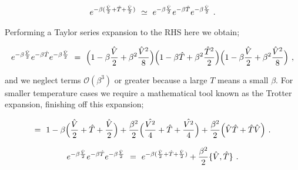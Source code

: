 \documentclass{article}
\begin{document}
\begin{equation} \label{eb-eq-1-185}
e^{-\beta ( \frac{\hat{V}}{2} + \hat{T} + \frac{\hat{V}}{2} )} \hspace{0.125cm} \simeq \hspace{0.125cm} e^{-\beta \frac{\hat{V}}{2}} e^{-\beta \hat{T}} e^{-\beta \frac{\hat{V}}{2}} \hspace{0.125cm} .
\end{equation}

Performing a Taylor series expansion to the RHS here we obtain;

\begin{equation} \label{eb-eq-1-186}
e^{-\beta \frac{\hat{V}}{2}} e^{-\beta \hat{T}} e^{-\beta \frac{\hat{V}}{2}} \hspace{0.125cm} = \hspace{0.125cm} \Big( 1 - \beta \frac{\hat{V}}{2} + \beta^2 \frac{\hat{V}^2}{8} \Big) \Big( 1 - \beta \hat{T} + \beta^2 \frac{\hat{T}^2}{2} \Big) \Big( 1 - \beta \frac{\hat{V}}{2} + \beta^2 \frac{\hat{V}^2}{8} \Big) \hspace{0.125cm} ,
\end{equation}

and we neglect terms \begin{math} \mathcal{O}(\beta^3) \end{math} or greater because a large \begin{math} T \end{math} means a small \begin{math} \beta \end{math}. For smaller temperature cases we require a mathematical tool known as the Trotter expansion, finishing off this expansion;

\begin{equation} \label{eb-eq-1-187}
= \hspace{0.125cm} 1 - \beta \Big( \frac{\hat{V}}{2} + \hat{T} + \frac{\hat{V}}{2} \Big) + \frac{\beta^2}{2} \Big( \frac{\hat{V^2}}{4} + \hat{T} + \frac{\hat{V^2}}{4} \Big) +  \frac{\beta^2}{2} \Big( \hat{V} \hat{T} + \hat{T} \hat{V} \Big) \hspace{0.125cm} .
\end{equation}

\begin{equation} \label{eb-eq-1-188}
e^{-\beta \frac{\hat{V}}{2}} e^{-\beta \hat{T}} e^{-\beta \frac{\hat{V}}{2}} \hspace{0.125cm} = \hspace{0.125cm} e^{-\beta ( \frac{\hat{V}}{2} + \hat{T} + \frac{\hat{V}}{2} )} + \frac{\beta^2}{2} \{ \hat{V} , \hat{T} \}  \hspace{0.125cm} .
\end{equation}
\end{document}
